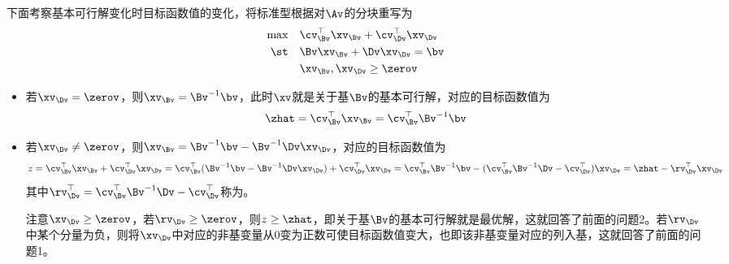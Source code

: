 \documentclass{ctexart}
\begin{document}
下面考察基本可行解变化时目标函数值的变化，将标准型根据对$\Av$的分块重写为
\begin{align*}
    \max \quad & \cv_\Bv^\top \xv_\Bv + \cv_\Dv^\top \xv_\Dv \\
    \st  \quad & \Bv \xv_\Bv + \Dv \xv_\Dv = \bv             \\
               & \xv_\Bv, \xv_\Dv \ge \zerov
\end{align*}
\begin{itemize}
    \item 若$\xv_\Dv = \zerov$，则$\xv_\Bv = \Bv^{-1} \bv$，此时$\xv$就是关于基$\Bv$的基本可行解，对应的目标函数值为
          \begin{align*}
              \zhat = \cv_\Bv^\top \xv_\Bv = \cv_\Bv^\top \Bv^{-1} \bv
          \end{align*}
    \item 若$\xv_\Dv \ne \zerov$，则$\xv_\Bv = \Bv^{-1} \bv - \Bv^{-1} \Dv \xv_\Dv$，对应的目标函数值为
          \begin{align*}
              z = \cv_\Bv^\top \xv_\Bv + \cv_\Dv^\top \xv_\Dv = \cv_\Bv^\top (\Bv^{-1} \bv - \Bv^{-1} \Dv \xv_\Dv) + \cv_\Dv^\top \xv_\Dv = \cv_\Bv^\top \Bv^{-1} \bv - (\cv_\Bv^\top \Bv^{-1} \Dv - \cv_\Dv^\top) \xv_\Dv = \zhat - \rv_\Dv^\top \xv_\Dv
          \end{align*}
          其中$\rv_\Dv^\top = \cv_\Bv^\top \Bv^{-1} \Dv - \cv_\Dv^\top$称为。

          注意$\xv_\Dv \ge \zerov$，若$\rv_\Dv \ge \zerov$，则$z \ge \zhat$，即关于基$\Bv$的基本可行解就是最优解，这就回答了前面的问题2。若$\rv_\Dv$中某个分量为负，则将$\xv_\Dv$中对应的非基变量从$0$变为正数可使目标函数值变大，也即该非基变量对应的列入基，这就回答了前面的问题1。
\end{itemize}
\end{document}
